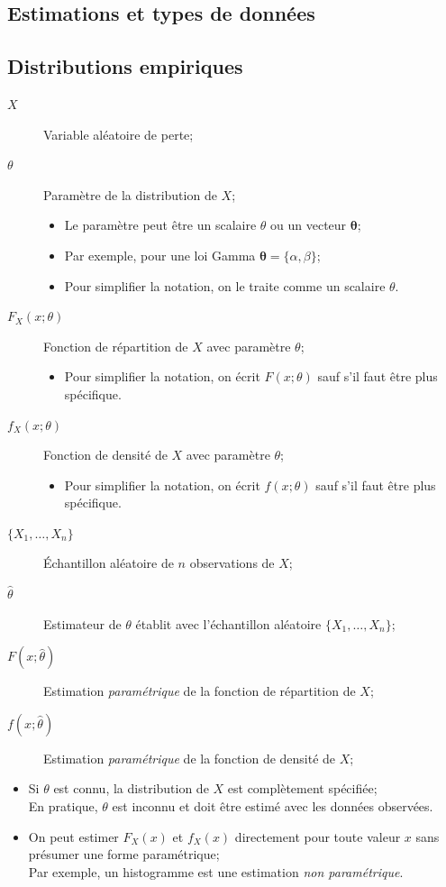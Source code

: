\documentclass[10pt, french]{article}
\begin{document}
\begin{multicols*}{2}
\pagebreak
\section{Estimations et types de données}
\subsection{Distributions empiriques}
\begin{distributions}[Notation]
\begin{description}
	\item[$X$]	Variable aléatoire de perte;
	\item[$\theta$]	Paramètre de la distribution de $X$;
		\begin{itemize}[leftmargin = *]
		\item	Le paramètre peut être un scalaire $\theta$ ou un vecteur $\bm{\theta}$;
		\item	Par exemple, pour une loi Gamma $\bm{\theta} = \{\alpha,	\beta\}$;
		\item	Pour simplifier la notation, on le traite comme un scalaire $\theta$.
		\end{itemize}
	\item[$F_{X}(x; \theta)$]	Fonction de répartition de $X$ avec paramètre $\theta$;
		\begin{itemize}[leftmargin = *]
		\item	Pour simplifier la notation, on écrit $F(x; \theta)$ sauf s'il faut être plus spécifique.
		\end{itemize}
	\item[$f_{X}(x; \theta)$]	Fonction de densité de $X$ avec paramètre $\theta$;
		\begin{itemize}[leftmargin = *]
		\item	Pour simplifier la notation, on écrit $f(x; \theta)$ sauf s'il faut être plus spécifique.
		\end{itemize}
	\item[$\{X_{1}, \dots, X_{n}\}$]	Échantillon aléatoire de $n$ observations de $X$;
	\item[$\hat{\theta}$]	Estimateur de $\theta$ établit avec l'échantillon aléatoire $\{X_{1}, \dots, X_{n}\}$;
	\item[$F(x; \hat{\theta})$]	Estimation \textit{paramétrique} de la fonction de répartition de $X$;
	\item[$f(x; \hat{\theta})$]	Estimation \textit{paramétrique} de la fonction de densité de $X$;
\end{description}
\end{distributions}
\begin{itemize}[leftmargin = *]
	\item	Si $\theta$ est connu, la distribution de $X$ est complètement spécifiée;\\
			En pratique, $\theta$ est inconnu et doit être estimé avec les données observées.
	\item	On peut estimer $F_{X}(x)$ et $f_{X}(x)$ directement pour toute valeur $x$ sans présumer une forme paramétrique;\\
			Par exemple, un histogramme est une estimation \textit{non paramétrique}.
\end{itemize}



\end{multicols*}
\end{document}
